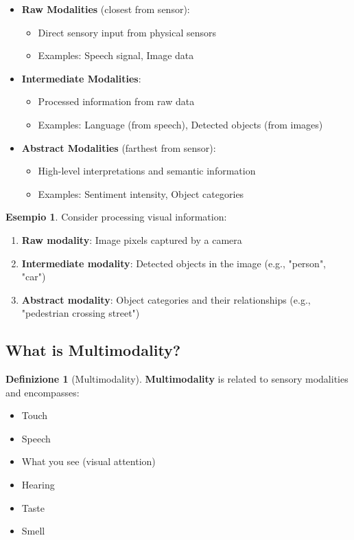 \documentclass[11pt,a4paper]{article}
\theoremstyle{definition}
\newtheorem{definition}{Definizione}[section]
\newtheorem{example}{Esempio}[section]
\theoremstyle{plain}
\theoremstyle{remark}
\begin{document}
\begin{itemize}
    \item \textbf{Raw Modalities} (closest from sensor):
    \begin{itemize}
        \item Direct sensory input from physical sensors
        \item Examples: Speech signal, Image data
    \end{itemize}
    
    \item \textbf{Intermediate Modalities}:
    \begin{itemize}
        \item Processed information from raw data
        \item Examples: Language (from speech), Detected objects (from images)
    \end{itemize}
    
    \item \textbf{Abstract Modalities} (farthest from sensor):
    \begin{itemize}
        \item High-level interpretations and semantic information
        \item Examples: Sentiment intensity, Object categories
    \end{itemize}
\end{itemize}

\begin{example}
Consider processing visual information:
\begin{enumerate}
    \item \textbf{Raw modality}: Image pixels captured by a camera
    \item \textbf{Intermediate modality}: Detected objects in the image (e.g., "person", "car")
    \item \textbf{Abstract modality}: Object categories and their relationships (e.g., "pedestrian crossing street")
\end{enumerate}
\end{example}

\subsection{What is Multimodality?}

\begin{definition}[Multimodality]
\textbf{Multimodality} is related to sensory modalities and encompasses:
\begin{itemize}
    \item Touch
    \item Speech
    \item What you see (visual attention)
    \item Hearing
    \item Taste
    \item Smell
\end{itemize}
\end{definition}
\end{document}
